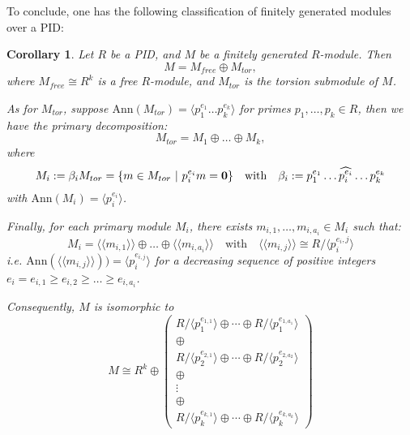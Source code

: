 \documentclass[12pt]{amsbook}
\newtheorem{corollary}[theorem]{Corollary}
\begin{document}
To conclude, one has the following classification of finitely generated modules over a PID: 
\begin{corollary} \label{cor-fgpid}
    Let $R$ be a PID, and $M$ be a finitely generated $R$-module. Then
    $$M = M_{free} \oplus M_{tor},$$ 
    where $M_{free} \cong R^k$ is a free $R$-module, and $M_{tor}$ is the torsion submodule of $M$.

\bigskip
    As for $M_{tor}$, suppose $\mathrm{Ann}(M_{tor}) = \langle p_1^{e_1} \dots p_k^{e_k} \rangle$ for primes $p_1, \dots, p_k \in R$, then we have the primary decomposition:
    $$M_{tor} = M_1 \oplus \dots \oplus M_k,$$
        where
        $$M_i := \beta_iM_{tor} = \{m \in M_{tor}\ |\ p_i^{e_i}m = {\bf 0}\} \quad \text{with} \quad \beta_i := p_1^{e_1} \dots \widehat{p_i^{e_i}} \dots p_k^{e_k}$$
        with $\mathrm{Ann}(M_i) = \langle p_i^{e_i} \rangle$.
        
\bigskip  
    Finally, for each primary module $M_i$, there exists $m_{i,1}, \dots, m_{i,a_i} \in M_i$ such that:
    $$M_i = \langle \langle m_{i,1} \rangle \rangle \oplus \dots \oplus \langle \langle m_{i,a_i} \rangle \rangle \quad \text{with} \quad \langle \langle m_{i,j} \rangle \rangle \cong R/\langle p_i^{e_i,j} \rangle$$
    i.e. $\mathrm{Ann}( \langle \langle m_{i,j} \rangle \rangle)) = \langle p_i^{e_{i,j}} \rangle$ for a decreasing sequence of positive integers $e_i = e_{i,1} \geq e_{i,2} \geq \dots \geq e_{i,a_i}$.

\bigskip
Consequently, $M$ is isomorphic to
$$M \cong R^k \oplus \begin{pmatrix} R/\langle p_1^{e_{1,1}} \rangle \oplus \cdots \oplus R/\langle p_1^{e_{1,a_1}} \rangle\\ 
\oplus \\
R/\langle p_2^{e_{2,1}} \rangle \oplus \cdots \oplus R/\langle p_2^{e_{2,a_2}} \rangle\\
\oplus \\
\vdots \\
\oplus \\
R/\langle p_k^{e_{k,1}} \rangle \oplus \cdots \oplus R/\langle p_k^{e_{k,a_k}} \rangle \end{pmatrix}$$
\end{corollary}
\end{document}
